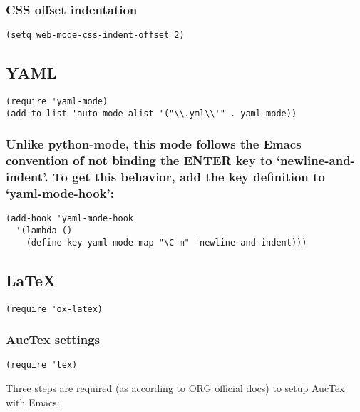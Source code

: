 \documentclass[11pt]{article}
\begin{document}
\subsubsection*{CSS offset indentation}
\label{sec:org9862038}
\begin{verbatim}
(setq web-mode-css-indent-offset 2)
\end{verbatim}

\subsection*{YAML}
\label{sec:org00badeb}

\begin{verbatim}
(require 'yaml-mode)
(add-to-list 'auto-mode-alist '("\\.yml\\'" . yaml-mode))
\end{verbatim}


\subsubsection*{Unlike python-mode, this mode follows the Emacs convention of not binding the ENTER key to `newline-and-indent'.  To get this behavior, add the key definition to `yaml-mode-hook':}
\label{sec:org0ca6140}

\begin{verbatim}
(add-hook 'yaml-mode-hook
  '(lambda ()
    (define-key yaml-mode-map "\C-m" 'newline-and-indent))) 
\end{verbatim}

\subsection*{\LaTeX{}}
\label{sec:orgc6f286b}

\begin{verbatim}
(require 'ox-latex)
\end{verbatim}

\subsubsection*{AucTex settings}
\label{sec:org892a796}

\begin{verbatim}
(require 'tex)
\end{verbatim}

Three steps are required (as according to ORG official docs) to setup AucTex with Emacs:
\end{document}
